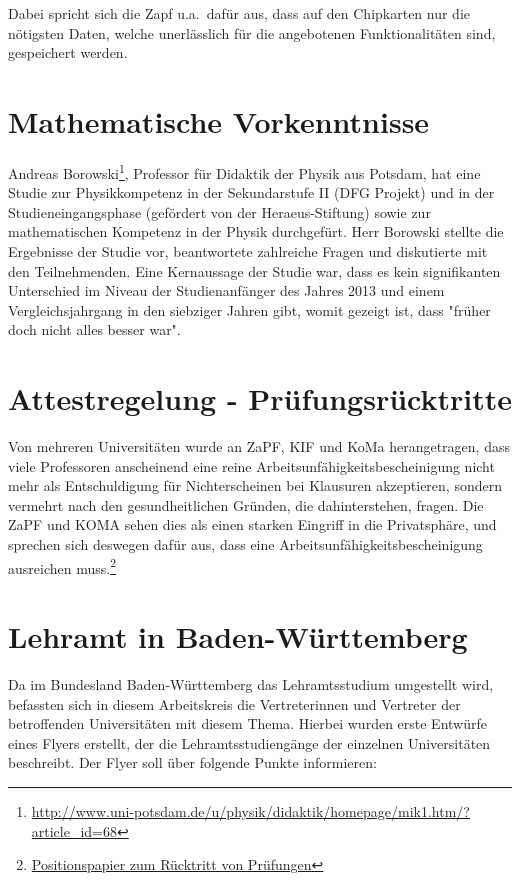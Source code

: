 Dabei spricht sich die Zapf u.a.\ dafür aus, dass auf den Chipkarten nur die
nötigsten Daten, welche unerlässlich für die angebotenen Funktionalitäten sind,
gespeichert werden.

\section*{Mathematische Vorkenntnisse}

Andreas Borowski\footnote{\href{http://www.uni-potsdam.de/u/physik/didaktik/homepage/mik1.htm/?article\_id=68}{\url{http://www.uni-potsdam.de/u/physik/didaktik/homepage/mik1.htm/?article\_id=68}}},
Professor für Didaktik der Physik aus Potsdam, hat eine Studie zur Physikkompetenz
in der Sekundarstufe II (DFG Projekt) und in der Studieneingangsphase
(gefördert von der Heraeus-Stiftung) sowie zur mathematischen Kompetenz in
der Physik durchgefürt. Herr Borowski stellte die Ergebnisse der Studie vor, beantwortete zahlreiche Fragen und diskutierte mit den Teilnehmenden. Eine Kernaussage der Studie war, dass es kein signifikanten Unterschied im Niveau der Studienanfänger des Jahres 2013 und einem Vergleichsjahrgang in den siebziger Jahren gibt, womit gezeigt ist, dass "früher doch nicht alles besser war".

\section*{Attestregelung - Prüfungsrücktritte}

Von mehreren Universitäten wurde an ZaPF, KIF und KoMa herangetragen, dass
viele Professoren anscheinend eine reine Arbeitsunfähigkeitsbescheinigung nicht mehr als
Entschuldigung für Nichterscheinen bei Klausuren akzeptieren,
sondern vermehrt nach den gesundheitlichen Gründen, die dahinterstehen, fragen.
Die ZaPF und KOMA sehen dies als einen starken Eingriff in die Privatsphäre, und
sprechen sich deswegen dafür aus, dass eine Arbeitsunfähigkeitsbescheinigung
ausreichen muss.\footnote{\href{https://vmp.ethz.ch/zapfwiki/images/c/cd/Positionspapier\_SoSe15\_Ruecktritt\_von\_Pruefungen.pdf}{Positionspapier zum Rücktritt von Prüfungen}}

\section*{Lehramt in Baden-Württemberg}

Da im Bundesland Baden-Württemberg das Lehramtsstudium umgestellt wird,
befassten sich in diesem Arbeitskreis die Vertreterinnen und Vertreter der
betroffenden Universitäten mit diesem Thema. Hierbei wurden erste Entwürfe
eines Flyers erstellt, der die Lehramtsstudiengänge der einzelnen Universitäten
beschreibt. Der Flyer soll über folgende Punkte informieren:


